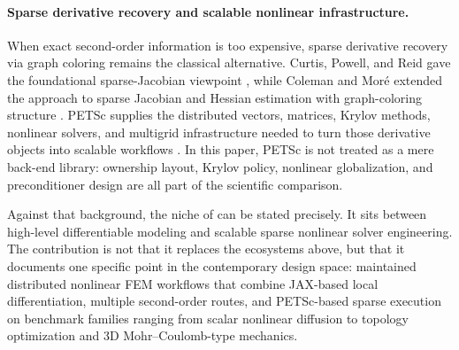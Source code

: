 \paragraph{Sparse derivative recovery and scalable nonlinear infrastructure.}
When exact second-order information is too expensive, sparse derivative recovery
via graph coloring remains the classical alternative. Curtis, Powell, and Reid
gave the foundational sparse-Jacobian viewpoint \citep{curtis1974sparsejacobian},
while Coleman and Mor{\'e} extended the approach to sparse Jacobian and Hessian
estimation with graph-coloring structure
\citep{coleman1983sparsejacobian,coleman1984sparsehessian}. PETSc supplies the
distributed vectors, matrices, Krylov methods, nonlinear solvers, and multigrid
infrastructure needed to turn those derivative objects into scalable workflows
\citep{balay1997petsc,petsc2024web}. In this paper, PETSc is not treated as a
mere back-end library: ownership layout, Krylov policy, nonlinear globalization,
and preconditioner design are all part of the scientific comparison.

Against that background, the niche of \repo{} can be stated precisely. It sits
between high-level differentiable modeling and scalable sparse nonlinear solver
engineering. The contribution is not that it replaces the ecosystems above, but
that it documents one specific point in the contemporary design space:
maintained distributed nonlinear FEM workflows that combine JAX-based local
differentiation, multiple second-order routes, and PETSc-based sparse execution
on benchmark families ranging from scalar nonlinear diffusion to topology
optimization and 3D Mohr--Coulomb-type mechanics.
